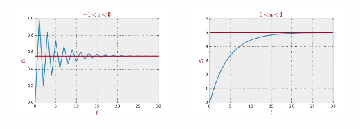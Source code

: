 \documentclass[10pt,usenames,dvipsnames]{beamer}
\theoremstyle{plain}
\theoremstyle{definition}
\begin{document}
\begin{frame}[fragile]
\begin{center}
\begin{tabular}{cc}
		\includegraphics[scale=0.3]{./figs/fig3} & \includegraphics[scale=0.3]{./figs/fig4}
\end{tabular}

\end{center}
\end{frame}
\end{document}
